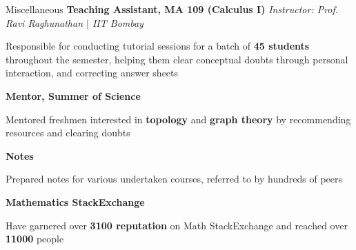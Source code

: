 \begin{rubric}{Miscellaneous}
    \entry*[2020] \textbf{Teaching Assistant, MA 109 (Calculus I)} \hfill \emph{Instructor: Prof. Ravi Raghunathan $\mid$ IIT Bombay}
	    
	    Responsible for conducting tutorial sessions for a batch of \textbf{45 students} throughout the semester, helping them clear conceptual doubts through personal interaction, and correcting answer sheets

	\entry*[2021] \textbf{Mentor, Summer of Science}

		Mentored freshmen interested in \textbf{topology} and \textbf{graph theory} by recommending resources and clearing doubts

	\entry*[2020--2022] \textbf{Notes}

		Prepared notes for various undertaken courses, referred to by hundreds of peers

	\entry* \textbf{Mathematics StackExchange}

		Have garnered over \textbf{3100 reputation} on Math StackExchange and reached over \textbf{11000} people
\end{rubric}